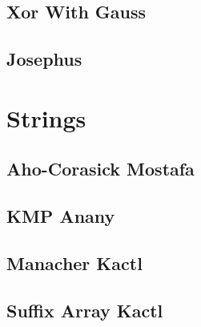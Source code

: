 \subsection{Xor With Gauss}
\vspace{-2.3ex}
\raggedbottom
\vspace{-3.3ex}
\hrulefill
\vspace{-1ex}
\subsection{Josephus}
\vspace{-2.3ex}
\raggedbottom
\vspace{-3.3ex}
\hrulefill

\section{Strings}
\vspace{-1ex}
\subsection{Aho-Corasick Mostafa}
\vspace{-2.3ex}
\raggedbottom
\vspace{-3.3ex}
\hrulefill
\vspace{-1ex}
\subsection{KMP Anany}
\vspace{-2.3ex}
\raggedbottom
\vspace{-3.3ex}
\hrulefill
\vspace{-1ex}
\subsection{Manacher Kactl}
\vspace{-2.3ex}
\raggedbottom
\vspace{-3.3ex}
\hrulefill
\vspace{-1ex}
\subsection{Suffix Array Kactl}
\vspace{-2.3ex}
\raggedbottom
\vspace{-3.3ex}
\hrulefill
\vspace{-1ex}
